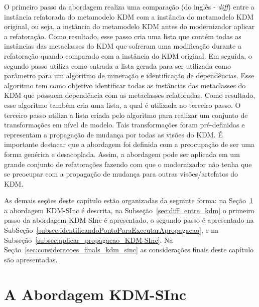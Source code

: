 O primeiro passo da abordagem realiza uma comparação (do inglês - \textit{diff}) entre a instância refatorada do metamodelo KDM com a instância do metamodelo KDM original, ou seja, a instância do metamodelo KDM antes do modernizador aplicar a refatoração. Como resultado, esse passo cria uma lista que contém todas as instâncias das metaclasses do KDM que sofreram uma modificação durante a refatoração quando comparado com a instância do KDM original. Em seguida, o segundo passo utiliza como entrada a lista gerada para ser utilizada como parâmetro para um algoritmo de mineração e identificação de dependências. Esse algoritmo tem como objetivo identificar todas as instâncias das metaclasses do KDM que possuem dependência com as metaclasses refatoradas. Como resultado, esse algoritmo também cria uma lista, a qual é utilizada no terceiro passo. O terceiro passo utiliza a lista criada pelo algoritmo para realizar um conjunto de transformações em nível de modelo. Tais transformações foram pré-definidas e representam a propagação de mudança por todas as visões do KDM. É importante destacar que a abordagem foi definida com a preocupação de ser uma forma genérica e desacoplada. Assim, a abordagem pode ser aplicada em um grande conjunto de refatorações fazendo com que o modernizador não tenha que se preocupar com a propagação de mudança para outras visões/artefatos do KDM. 

As demais seções deste capítulo estão organizadas da seguinte forma: na Seção~\ref{sec:kdm_sinc} a abordagem KDM-SInc é descrita, na Subseção~\ref{sec:diff_entre_kdm} o primeiro passo da abordagem KDM-SInc é apresentado, o segundo passo é apresentado na SubSeção~\ref{subsec:identificandoPontoParaExecutarApropagacao}, e na Subseção~\ref{subsec:aplicar_propagacao_KDM-SInc}. Na Seção~\ref{sec:consideracoes_finals_kdm_sinc} as considerações finais deste capítulo são apresentadas.


\section{A Abordagem KDM-SInc}\label{sec:kdm_sinc}

